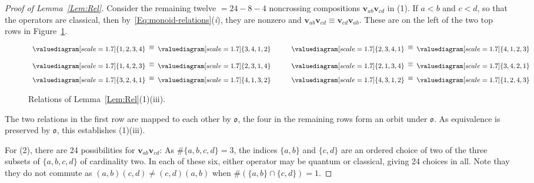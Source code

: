\documentclass[12pt,oneside,reqno]{amsart}
\theoremstyle{definition}
\numberwithin{equation}{section}
\newcommand{\qv}{{\mathbf v}}
\newcommand{\ncycle}{\mathfrak o}
\begin{document}
\begin{proof}[Proof of Lemma~\ref{Lem:Rel}]
 Consider the remaining twelve $=24-8-4$ noncrossing compositions $\qv_{ab}\qv_{cd}$ in (1).
 If $a<b$ and $c<d$, so that the operators are classical, then by~\eqref{Eq:monoid-relations}({\it i}), they are nonzero
 and $\qv_{ab}\qv_{cd}\equiv\qv_{cd}\qv_{ab}$.
 These are on the left of the two top rows in Figure~\ref{fig:degree-2-nonzero-relations}.
\begin{figure}[htpb]
 \[
   \begin{array}{r@{\hskip5pt}c@{\hskip5pt}l@{\hskip3em}r@{\hskip5pt}c@{\hskip5pt}l}
      \valuediagram[scale=1.7]{{1,2},{3,4}} & \raisebox{3pt}{$\equiv$} & \valuediagram[scale=1.7]{{3,4},{1,2}} &
      \valuediagram[scale=1.7]{{2,3},{4,1}} & \raisebox{3pt}{$\equiv$} & \valuediagram[scale=1.7]{{4,1},{2,3}}
      \\[3ex]
      \valuediagram[scale=1.7]{{1,4},{2,3}} & \raisebox{3pt}{$\equiv$} & \valuediagram[scale=1.7]{{2,3},{1,4}} &
      \valuediagram[scale=1.7]{{2,1},{3,4}} & \raisebox{3pt}{$\equiv$} & \valuediagram[scale=1.7]{{3,4},{2,1}}
      \\[2ex]
      \valuediagram[scale=1.7]{{3,2},{4,1}} & \raisebox{3pt}{$\equiv$} & \valuediagram[scale=1.7]{{4,1},{3,2}} &
      \valuediagram[scale=1.7]{{4,3},{1,2}} & \raisebox{3pt}{$\equiv$} & \valuediagram[scale=1.7]{{1,2},{4,3}}
   \end{array}
 \]
 \caption{Relations of Lemma~\ref{Lem:Rel}(1)(iii).}
 \label{fig:degree-2-nonzero-relations}
\end{figure}
 The two relations in the first row are mapped to each other by $\ncycle$,  the four in the remaining rows form an
 orbit under $\ncycle$.
 As equivalence is preserved by $\ncycle$, this establishes (1)(iii).


 For (2),  there are 24 possibilities for $\qv_{ab}\qv_{cd}$:
 As $\#\{a,b,c,d\}=3$, the indices $\{a,b\}$ and $\{c,d\}$ are an ordered choice of two of the three subsets of $\{a,b,c,d\}$ of
 cardinality two. 
 In each of these six, either operator may be quantum or classical, giving 24 choices in all.
 Note thay they do not commute as $(a,b)(c,d)\neq(c,d)(a,b)$ when $\#(\{a,b\}\cap\{c,d\})=1$.


\end{proof}
\end{document}
